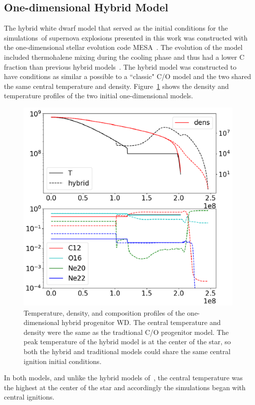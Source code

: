 \documentclass[iop,apj]{emulateapj}
\begin{document}
\subsection{One-dimensional Hybrid Model}

The hybrid white dwarf model that served as the initial conditions 
for the simulations of supernova explosions presented in this work
was constructed with the one-dimensional stellar evolution code 
MESA~\citep{mesa1,mesa2,mesa3,mesa3e}. The evolution of the model 
included thermohalene mixing during the cooling phase and thus
had a lower C fraction than previous hybrid models~\citep{brooksetal2017}.
The hybrid model was constructed to have conditions as similar a possible
to a ``classic" C/O model and the two shared the same central temperature
and density.  Figure~\ref{fig:init_conds} shows the density and temperature
profiles of the two initial one-dimensional models. 
\begin{figure}
\includegraphics[width=\columnwidth]{figures/initial_conds.png}
\caption{\label{fig:init_conds}
Temperature, density, and  composition profiles of the one-dimensional hybrid 
progenitor WD. The central temperature and density were the same as
the tradtional C/O progenitor model. 
The peak temperature of the hybrid model is at the center of the star, 
so both the hybrid and traditional models could share the same 
	central ignition initial conditions.
}
\end{figure}
In both models, and unlike the hybrid models of~\citet{willcoxetal2016}, the central
temperature was the highest at the center of the star and accordingly the simulations 
began with central ignitions. 
\end{document}
